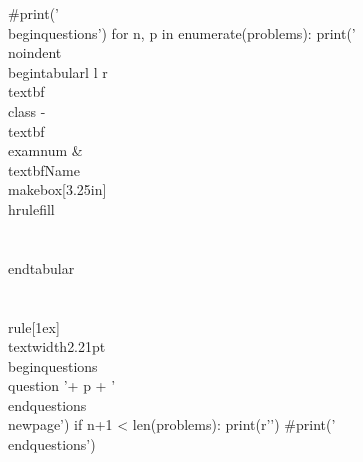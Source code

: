\documentclass[12pt]{exam}
\newcommand{\class}{PHYS 110}
\newcommand{\examnum}{C10 (v2)}
\begin{document}
\begin{pycode}
#print('\\begin{questions}')
for n, p in enumerate(problems):
    print('\\noindent \\begin{tabular}{l l r} \\textbf{\\class} - \\textbf{\\examnum}  & \\textbf{Name} \\makebox[3.25in]{\\hrulefill}  \\\\ \\end{tabular} \\\\ \\rule[1ex]{\\textwidth}{2.21pt} \\begin{questions}\\question '+ p + '\\end{questions}\\newpage')
    if n+1 < len(problems):
        print(r'\vspace{1in}')
#print('\\end{questions}')


\end{pycode}


	
\end{document}

